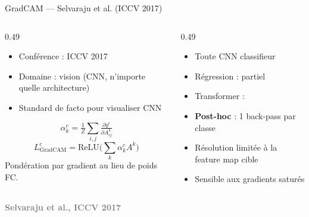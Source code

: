 \documentclass[10pt]{beamer}
\newcommand{\source}[1]{\vspace{4pt}\hfill{\textcolor{gray}{\textbf{\tiny #1}}}}
\begin{document}
\begin{frame}{GradCAM — Selvaraju et al. (ICCV 2017)}
  \begin{columns}
    \begin{column}{0.49\textwidth}
      \begin{ctxbox}
        \begin{itemize}
          \item Conférence : ICCV 2017
          \item Domaine : vision (CNN, n'importe quelle architecture)
          \item Standard de facto pour visualiser CNN
        \end{itemize}
      \end{ctxbox}
      \begin{probbox}
        \[
          \alpha_k^c = \tfrac{1}{Z}\sum_{i,j} \tfrac{\partial y^c}{\partial A^k_{ij}}
        \]
        \[
          L^c_{\text{GradCAM}} = \text{ReLU}\!\bigl(\textstyle\sum_k \alpha_k^c A^k\bigr)
        \]
        Pondération par gradient au lieu de poids FC.
      \end{probbox}
    \end{column}
    \begin{column}{0.49\textwidth}
      \begin{transposbox}
        \begin{itemize}
          \item Toute CNN classifieur \checkmark
          \item Régression : partiel
          \item Transformer : \texttimes
        \end{itemize}
      \end{transposbox}
      \begin{limitbox}
        \begin{itemize}
          \item \textbf{Post-hoc} : 1 back-pass par classe
          \item Résolution limitée à la feature map cible
          \item Sensible aux gradients saturés
        \end{itemize}
      \end{limitbox}
    \end{column}
  \end{columns}
  \source{Selvaraju et al., ICCV 2017}
\end{frame}
\end{document}
